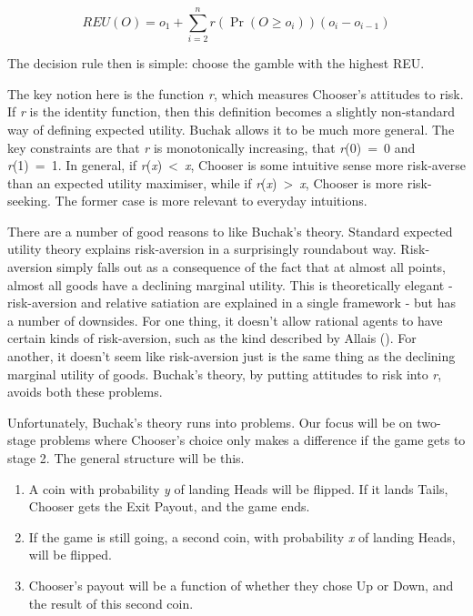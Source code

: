 \documentclass[
  12pt,
  letterpaper,
  DIV=11,
  numbers=noendperiod]{scrreprt}
\providecommand{\tightlist}{%
  \setlength{\itemsep}{0pt}\setlength{\parskip}{0pt}}\usepackage{longtable,booktabs,array}
\begin{document}
\[
REU(O) = o_1 + \sum_{i = 2}^n r(\Pr(O \geq o_i))(o_i - o_{i-1})
\]

The decision rule then is simple: choose the gamble with the highest
REU.

The key notion here is the function \emph{r}, which measures Chooser's
attitudes to risk. If \emph{r} is the identity function, then this
definition becomes a slightly non-standard way of defining expected
utility. Buchak allows it to be much more general. The key constraints
are that \emph{r} is monotonically increasing, that \emph{r}(0)~=~0 and
\emph{r}(1)~=~1. In general, if \emph{r}(\emph{x})~\textless~\emph{x},
Chooser is some intuitive sense more risk-averse than an expected
utility maximiser, while if \emph{r}(\emph{x})~\textgreater~\emph{x},
Chooser is more risk-seeking. The former case is more relevant to
everyday intuitions.

There are a number of good reasons to like Buchak's theory. Standard
expected utility theory explains risk-aversion in a surprisingly
roundabout way. Risk-aversion simply falls out as a consequence of the
fact that at almost all points, almost all goods have a declining
marginal utility. This is theoretically elegant - risk-aversion and
relative satiation are explained in a single framework - but has a
number of downsides. For one thing, it doesn't allow rational agents to
have certain kinds of risk-aversion, such as the kind described by
Allais (). For another, it doesn't seem
like risk-aversion just is the same thing as the declining marginal
utility of goods. Buchak's theory, by putting attitudes to risk into
\emph{r}, avoids both these problems.

Unfortunately, Buchak's theory runs into problems. Our focus will be on
two-stage problems where Chooser's choice only makes a difference if the
game gets to stage 2. The general structure will be this.

\begin{enumerate}
\def\labelenumi{\arabic{enumi}.}
\tightlist
\item
  A coin with probability \emph{y} of landing Heads will be flipped. If
  it lands Tails, Chooser gets the Exit Payout, and the game ends.
\item
  If the game is still going, a second coin, with probability \emph{x}
  of landing Heads, will be flipped.
\item
  Chooser's payout will be a function of whether they chose Up or Down,
  and the result of this second coin.
\end{enumerate}
\end{document}
